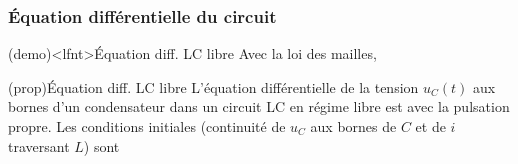 \documentclass[../../main/main.tex]{subfiles}
\begin{document}
\subsubsection{Équation différentielle du circuit}
\begin{tcb}[label=demo:eqdiffrc](demo)<lfnt>{Équation diff. LC libre}
	Avec la loi des mailles,
\end{tcb}
\begin{tcb}[label=prop:eqdiffrc, sidebyside, righthand ratio=.4](prop){Équation diff. LC libre}
	L'équation différentielle de la tension $u_C(t)$ aux bornes d'un
	condensateur dans un circuit LC en régime libre est
	\psw{
		\[
			\boxed{\dv[2]{u_C}{t} + \w_0{}^2u_C = 0}
		\]
	}
	avec  la pulsation propre.
	\tcblower
	Les conditions initiales (continuité de $u_C$ aux bornes de $C$
	et de $i$ traversant $L$) sont
\end{tcb}
\end{document}
